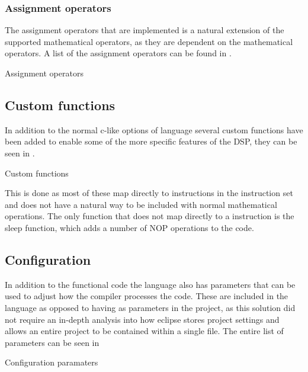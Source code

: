 \subsubsection{Assignment operators}
The assignment operators that are implemented is a natural extension of the supported mathematical operators, as they are dependent on the mathematical operators. A list of the assignment operators can be found in .
\begin{table}[H]
	\centering
		
		\caption{Assignment operators}
		\label{tab:assignmentOperators}
\end{table}

\subsection{Custom functions}
In addition to the normal c-like options of language several custom functions have been added to enable some of the more specific features of the DSP, they can be seen in . 
\begin{table}[H]
	\centering
		
		\caption{Custom functions}
		\label{tab:customfunctions}
\end{table}
This is done as most of these map directly to instructions in the instruction set and does not have a natural way to be included with normal mathematical operations. The only function that does not map directly to a instruction is the sleep function, which adds a number of NOP operations to the code.

\subsection{Configuration}

In addition to the functional code the language also has parameters that can be used to adjust how the compiler processes the code. These are included in the language as opposed to having as parameters in the project, as this solution did not require an in-depth analysis into how eclipse stores project settings and allows an entire project to be contained within a single file. The entire list of parameters can be seen in 

\begin{savenotes}
	\begin{table}[H]
		\centering
			
			\caption{Configuration paramaters}
		\label{tab:configurations}
	\end{table}
\end{savenotes}


